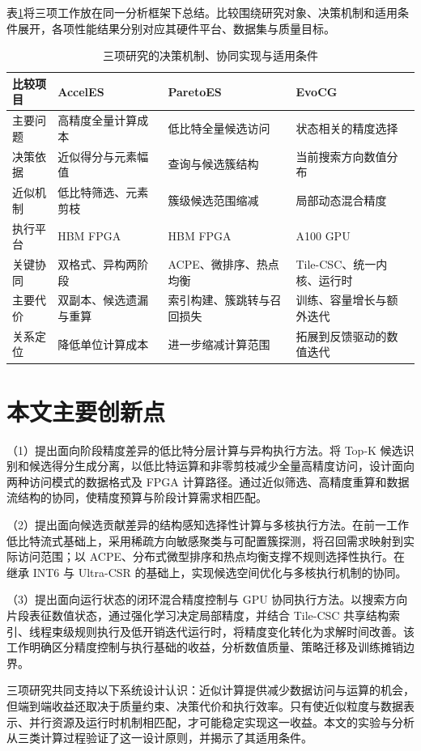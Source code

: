 表\ref{tab:summary}将三项工作放在同一分析框架下总结。比较围绕研究对象、决策机制和适用条件展开，各项性能结果分别对应其硬件平台、数据集与质量目标。
\begin{table}[htbp]\centering
\caption{三项研究的决策机制、协同实现与适用条件}\label{tab:summary}
\begin{tabularx}{\textwidth}{p{2cm}XXX}\toprule
比较项目&AccelES&ParetoES&EvoCG\\\midrule
主要问题&高精度全量计算成本&低比特全量候选访问&状态相关的精度选择\\
决策依据&近似得分与元素幅值&查询与候选簇结构&当前搜索方向数值分布\\
近似机制&低比特筛选、元素剪枝&簇级候选范围缩减&局部动态混合精度\\
执行平台&HBM FPGA&HBM FPGA&A100 GPU\\
关键协同&双格式、异构两阶段&ACPE、微排序、热点均衡&Tile-CSC、统一内核、运行时\\
主要代价&双副本、候选遗漏与重算&索引构建、簇跳转与召回损失&训练、容量增长与额外迭代\\
关系定位&降低单位计算成本&进一步缩减计算范围&拓展到反馈驱动的数值迭代\\\bottomrule
\end{tabularx}
\end{table}

\section{本文主要创新点}
（1）提出面向阶段精度差异的低比特分层计算与异构执行方法。将 Top-K 候选识别和候选得分生成分离，以低比特运算和非零剪枝减少全量高精度访问，设计面向两种访问模式的数据格式及 FPGA 计算路径。通过近似筛选、高精度重算和数据流结构的协同，使精度预算与阶段计算需求相匹配。

（2）提出面向候选贡献差异的结构感知选择性计算与多核执行方法。在前一工作低比特流式基础上，采用稀疏方向敏感聚类与可配置簇探测，将召回需求映射到实际访问范围；以 ACPE、分布式微型排序和热点均衡支撑不规则选择性执行。在继承 INT6 与 Ultra-CSR 的基础上，实现候选空间优化与多核执行机制的协同。

（3）提出面向运行状态的闭环混合精度控制与 GPU 协同执行方法。以搜索方向片段表征数值状态，通过强化学习决定局部精度，并结合 Tile-CSC 共享结构索引、线程束级规则执行及低开销迭代运行时，将精度变化转化为求解时间改善。该工作明确区分精度控制与执行基础的收益，分析数值质量、策略迁移及训练摊销边界。

三项研究共同支持以下系统设计认识：近似计算提供减少数据访问与运算的机会，但端到端收益还取决于质量约束、决策代价和执行效率。只有使近似粒度与数据表示、并行资源及运行时机制相匹配，才可能稳定实现这一收益。本文的实验与分析从三类计算过程验证了这一设计原则，并揭示了其适用条件。

